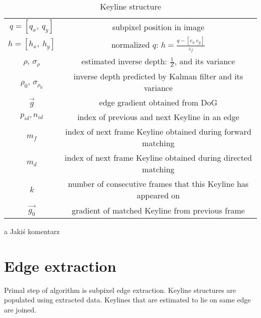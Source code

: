 \begin{table}[ht]
	\centering
	
	\begin{threeparttable}
		\caption{Keyline structure}
		\label{tab:keyline}
		
		\begin{tabularx}{1.0\textwidth}{C{0.25} C{0.75}}
			\toprule
			 &  \\
			\midrule
			$q = [q_{x},\ q_{y}]$ & subpixel position in image \\
			$h = [h_{x},\ h_{y}]$ & normalized $q$: $h = \frac{q - [c_{x}\ c_{y}]}{z_f}$ \\
			$\rho$, $\sigma_{\rho}$ & estimated inverse depth: $\frac{1}{Z}$, and its variance \\
			$\rho_0$, $\sigma_{\rho_{0}}$ & inverse depth predicted by Kalman filter and its variance \\
			$\vec{g}$ & edge gradient obtained from DoG \\
			$p_{id}, n_{id}$ & index of previous and next Keyline in an edge \\
			$m_f$ & index of next frame Keyline obtained during forward matching \\
			$m_d$ & index of next frame Keyline obtained during directed matching \\
			$k$ & number of consecutive frames that this Keyline has appeared on \\
			$\vec{g_{0}}$ & gradient of matched Keyline from previous frame \\
			\bottomrule
		\end{tabularx}
		
		\begin{tablenotes}
			\footnotesize
			\item[a] Jakiś komentarz\textellipsis
		\end{tablenotes}
		
	\end{threeparttable}
\end{table}


\section{Edge extraction}

Primal step of algorithm is subpixel edge extraction. Keyline structures are populated using extracted data. Keylines that are estimated to lie on same edge are joined.

